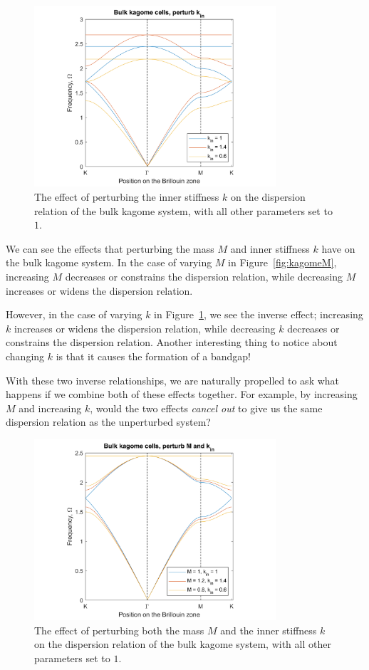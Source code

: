 \begin{figure}[!h]
\centering
\includegraphics[width=0.8\textwidth]{imgs/kagomeperturbk.png}
\caption{\label{fig:kagomek} The effect of perturbing the inner stiffness $k$
  on the dispersion relation of the bulk kagome system, with all other
  parameters set to $1$.}
\end{figure}

We can see the effects that perturbing the mass $M$ and inner stiffness $k$
have on the bulk kagome system. In the case of varying $M$ in
Figure~\ref{fig:kagomeM}, increasing $M$ decreases or constrains the dispersion
relation, while decreasing $M$ increases or widens the dispersion relation. 

However, in the case of varying $k$ in Figure~\ref{fig:kagomek}, we see the inverse
effect; increasing $k$ increases or widens the dispersion relation, while
decreasing $k$ decreases or constrains the dispersion relation. Another
interesting thing to notice about changing $k$ is that it causes the formation
of a bandgap!

With these two inverse relationships, we are naturally propelled to ask what
happens if we combine both of these effects together. For example, by
increasing $M$ and increasing $k$, would the two effects \textit{cancel out} to
give us the same dispersion relation as the unperturbed system?

\begin{figure}[!h]
\centering
\includegraphics[width=0.8\textwidth]{imgs/kagomeperturb2.png}
\caption{\label{fig:kagome2} The effect of perturbing both the mass $M$ and the
  inner stiffness $k$ on the dispersion relation of the bulk kagome system,
  with all other parameters set to $1$.}
\end{figure}

